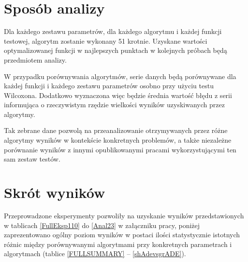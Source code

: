 \documentclass[12pt,a4paper]{report}
\begin{document}
{{{{{{{\section{Sposób analizy}
\par{
Dla każdego zestawu parametrów, dla każdego algorytmu i każdej funkcji testowej, algorytm zostanie wykonany 51 krotnie. Uzyskane wartości optymalizowanej funkcji w najlepszych punktach w kolejnych próbach będą przedmiotem analizy.
}
\par{
W przypadku porównywania algorytmów, serie danych będą porównywane dla każdej funkcji i każdego zestawu parametrów osobno przy użyciu testu Wilcoxona. Dodatkowo wyznaczona więc będzie średnia wartość błędu z serii informująca o rzeczywistym rzędzie wielkości wyników uzyskiwanych przez algorytmy.
}
\par{
Tak zebrane dane pozwolą na przeanalizowanie otrzymywanych przez różne algorytmy wyników w kontekście konkretnych problemów, a także niezależne porównanie wyników z innymi opublikowanymi pracami wykorzystującymi ten sam zestaw testów.
}
\section{Skrót wyników}
\par{
Przeprowadzone eksperymenty pozwoliły na uzyskanie wyników przedstawionych w tablicach \ref{FullEksp110} do \ref{Anal23} w załączniku pracy, poniżej zaprezentowano ogólny poziom wyników w postaci ilości statystycznie istotnych różnic między porównywanymi algorytmami przy konkretnych parametrach i algorytmach (tablice \ref{FULLSUMMARY} -- \ref{shAdevsgrADE}).
}

}}}}}}}
\end{document}
